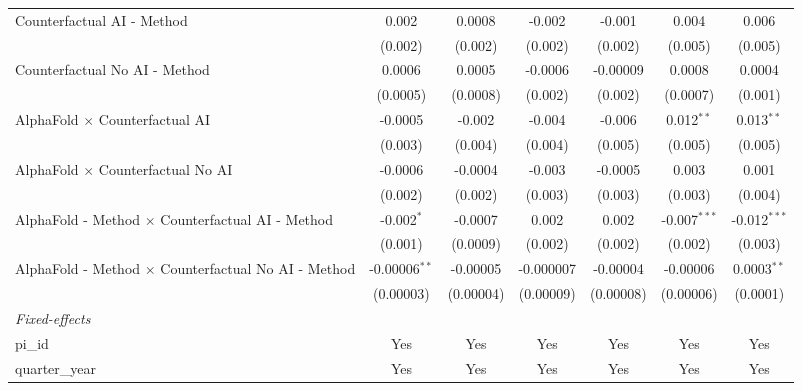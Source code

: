 \begin{tabular}{lcccccc}
   Counterfactual AI - Method                                 & 0.002           & 0.0008    & -0.002    & -0.001    & 0.004          & 0.006\\   
                                                              & (0.002)         & (0.002)   & (0.002)   & (0.002)   & (0.005)        & (0.005)\\   
   Counterfactual No AI - Method                              & 0.0006          & 0.0005    & -0.0006   & -0.00009  & 0.0008         & 0.0004\\   
                                                              & (0.0005)        & (0.0008)  & (0.002)   & (0.002)   & (0.0007)       & (0.001)\\   
   AlphaFold $\times$ Counterfactual AI                       & -0.0005         & -0.002    & -0.004    & -0.006    & 0.012$^{**}$   & 0.013$^{**}$\\   
                                                              & (0.003)         & (0.004)   & (0.004)   & (0.005)   & (0.005)        & (0.005)\\   
   AlphaFold $\times$ Counterfactual No AI                    & -0.0006         & -0.0004   & -0.003    & -0.0005   & 0.003          & 0.001\\   
                                                              & (0.002)         & (0.002)   & (0.003)   & (0.003)   & (0.003)        & (0.004)\\   
   AlphaFold - Method $\times$ Counterfactual AI - Method     & -0.002$^{*}$    & -0.0007   & 0.002     & 0.002     & -0.007$^{***}$ & -0.012$^{***}$\\   
                                                              & (0.001)         & (0.0009)  & (0.002)   & (0.002)   & (0.002)        & (0.003)\\   
   AlphaFold - Method $\times$ Counterfactual No AI - Method  & -0.00006$^{**}$ & -0.00005  & -0.000007 & -0.00004  & -0.00006       & 0.0003$^{**}$\\   
                                                              & (0.00003)       & (0.00004) & (0.00009) & (0.00008) & (0.00006)      & (0.0001)\\   
   \midrule
   \emph{Fixed-effects}\\
   pi\_id                                                     & Yes             & Yes       & Yes       & Yes       & Yes            & Yes\\  
   quarter\_year                                              & Yes             & Yes       & Yes       & Yes       & Yes            & Yes\\  

\end{tabular}
